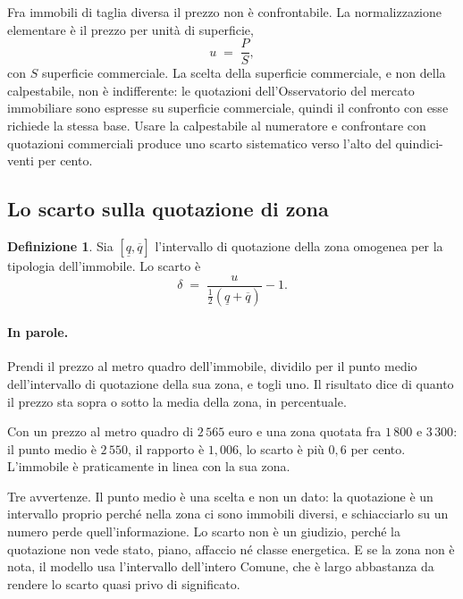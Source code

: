 \documentclass[11pt,a4paper]{article}
\theoremstyle{definition}
\newtheorem{definizione}{Definizione}[section]
\theoremstyle{plain}
\begin{document}
Fra immobili di taglia diversa il prezzo non è confrontabile. La normalizzazione elementare è il prezzo per unità di superficie,
\begin{equation}
u \;=\; \frac{P}{S},
\label{eq:prezzo-mq}
\end{equation}
con $S$ superficie commerciale. La scelta della superficie commerciale, e non della calpestabile, non è indifferente: le quotazioni dell'Osservatorio del mercato immobiliare sono espresse su superficie commerciale, quindi il confronto con esse richiede la stessa base. Usare la calpestabile al numeratore e confrontare con quotazioni commerciali produce uno scarto sistematico verso l'alto del quindici-venti per cento.

\subsection{Lo scarto sulla quotazione di zona}

\begin{definizione}
Sia $[\underline{q},\overline{q}]$ l'intervallo di quotazione della zona omogenea per la tipologia dell'immobile. Lo scarto è
\begin{equation}
\delta \;=\; \frac{u}{\tfrac{1}{2}(\underline{q}+\overline{q})} - 1 .
\label{eq:scarto}
\end{equation}

\paragraph{In parole.} Prendi il prezzo al metro quadro dell'immobile, dividilo per il punto medio dell'intervallo di quotazione della sua zona, e togli uno. Il risultato dice di quanto il prezzo sta sopra o sotto la media della zona, in percentuale.

Con un prezzo al metro quadro di $2\,565$ euro e una zona quotata fra $1\,800$ e $3\,300$: il punto medio è $2\,550$, il rapporto è $1{,}006$, lo scarto è più $0{,}6$ per cento. L'immobile è praticamente in linea con la sua zona.

Tre avvertenze. Il punto medio è una scelta e non un dato: la quotazione è un intervallo proprio perché nella zona ci sono immobili diversi, e schiacciarlo su un numero perde quell'informazione. Lo scarto non è un giudizio, perché la quotazione non vede stato, piano, affaccio né classe energetica. E se la zona non è nota, il modello usa l'intervallo dell'intero Comune, che è largo abbastanza da rendere lo scarto quasi privo di significato.
\end{definizione}
\end{document}
